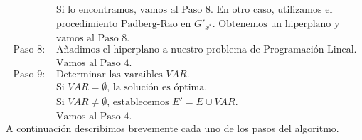 \documentclass[twoside,a4paper,openright,12pt,tikz]{book}
\begin{document}
\begin{align*}
&\text{Si lo encontramos, vamos al Paso 8. En otro caso, utilizamos el}\\
&\text{procedimiento Padberg-Rao en $G'_{x^*}$. Obtenemos un hiperplano y}\\
&\text{vamos al Paso 8.}\\
\text{Paso 8: }&\text{Añadimos el hiperplano a nuestro problema de Programación Lineal.}\\
&\text{Vamos al Paso 4.}\\
\text{Paso 9: }&\text{Determinar las varaibles $VAR$.}\\
&\text{Si $VAR=\emptyset$, la solución es óptima. }\\
&\text{Si $VAR\neq\emptyset$, establecemos $E'=E\cup VAR$.}\\
&\text{Vamos al Paso 4.}
\end{align*}
A continuación describimos brevemente cada uno de los pasos del algoritmo.
\end{document}
